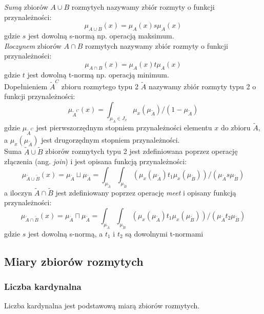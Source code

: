 \documentclass{classrep}
\begin{document}
\textit{Sumą} zbiorów $A \cup B$ rozmytych nazywamy zbiór rozmyty o funkcji przynależności:
\begin{equation}
\mu_{A \cup B}(x)=\mu_A(x)s\mu_A(x)
\end{equation}
gdzie $s$ jest dowolną s-normą np. operacją maksimum.
\\

\textit{Iloczynem} zbiorów $A \cap B$ rozmytych nazywamy zbiór rozmyty o funkcji przynależności:
\begin{equation}
\mu_{A \cap B}(x)=\mu_A(x)t\mu_A(x)
\end{equation}
gdzie $t$ jest dowolną t-normą np. operacją minimum.
\\

Dopełnieniem $\tilde{A}^C$ zbioru rozmytego typu 2 $\tilde{A}$ nazywamy zbiór rozmyty typu 2 o funkcji przynależności:
\begin{equation}
\mu_{\tilde{A}^C}(x)=\int_{\mu_{\tilde{A}} \in J_x} \mu_x(\mu_{\tilde{A}})/(1-\mu_{\tilde{A}})
 \end{equation}
gdzie $\mu_{\tilde{A}^C}$ jest pierwszorzędnym stopniem przynależności elementu $x$ do zbioru $\tilde{A}$, a $\mu_x(\mu_{\tilde{A}})$ jest drugorzędnym stopniem przynależności.
\\

Suma $\tilde{A} \cup \tilde{B}$ zbiorów rozmytych typu 2 jest zdefiniowana poprzez operację złączenia (ang. \textit{join}) i jest opisana funkcją przynależności:
\begin{equation}
\mu_{\tilde{A} \cup \tilde{B}}(x) = \mu_{\tilde{A}} \sqcup \mu_{\tilde{A}} = \int_{\mu_{\tilde{A}}}\int_{\mu_{\tilde{B}}}(\mu_x(\mu_{\tilde{A}}) t_1 \mu_x(\mu_{\tilde{B}}))/(\mu_{\tilde{A}} s \mu_{\tilde{B}})
\end{equation}
a iloczyn $\tilde{A} \cap \tilde{B}$ jest zdefiniowany poprzez operację \textit{meet} i opisany funkcją przynależności:
\begin{equation}
\mu_{\tilde{A} \cap \tilde{B}}(x) = \mu_{\tilde{A}} \sqcap \mu_{\tilde{A}} = \int_{\mu_{\tilde{A}}}\int_{\mu_{\tilde{B}}}(\mu_x(\mu_{\tilde{A}}) t_1 \mu_x(\mu_{\tilde{B}}))/(\mu_{\tilde{A}} t_2 \mu_{\tilde{B}})
\end{equation}
gdzie $s$ jest dowolną s-normą, a $t_1$ i $t_2$ są dowolnymi t-normami

\subsection{Miary zbiorów rozmytych}
\subsubsection{Liczba kardynalna}
Liczba kardynalna jest podstawową miarą zbiorów rozmytych.
\end{document}
